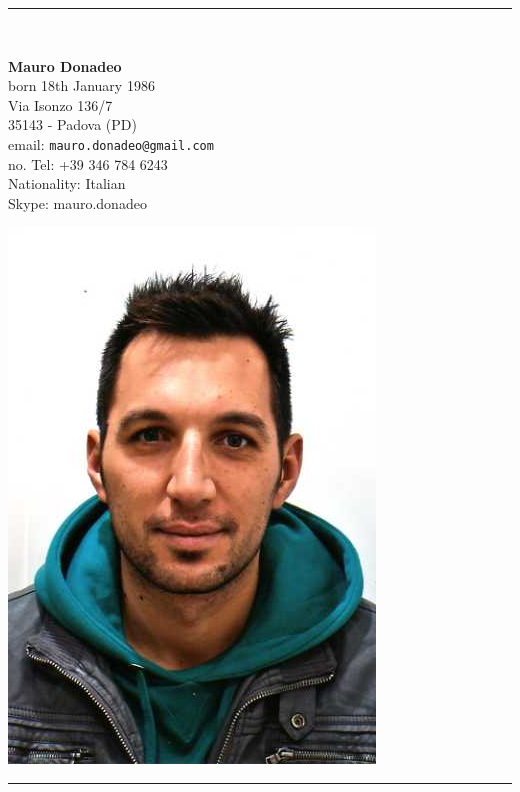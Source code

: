 \documentclass[pdftex,a4paper,10pt,twoside,titlepage,italian]{article}
\begin{document}
\begin{center}
\rule{.8 \textwidth}{1pt}\\[5pt]
\begin{minipage}{.55\textwidth}
	\LARGE\textbf{Mauro Donadeo}\\[16pt]
	\footnotesize{born 18th January 1986}\\
	\footnotesize Via Isonzo 136/7 \\ 
	35143 - Padova (PD)\\
	email: \texttt{mauro.donadeo@gmail.com}\\
	\footnotesize {no. Tel: +39 346 784 6243}\\
	\footnotesize Nationality: Italian\\
	\footnotesize {Skype: mauro.donadeo}
\end{minipage}
\begin{minipage}{.25\textwidth}
	\includegraphics[width=\textwidth]{io.jpg}
\end{minipage}
\rule{.8 \textwidth}{1pt}\\[5pt]
\end{center}
\vspace{0.5cm}
\end{document}
